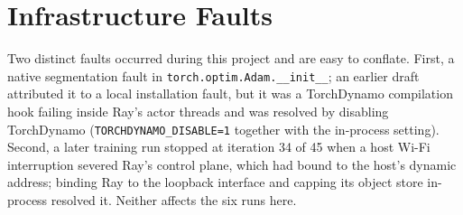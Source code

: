 \documentclass[12pt]{article}
\begin{document}
\section{Infrastructure Faults}
Two distinct faults occurred during this
project and are easy to conflate. First, a native segmentation fault in
\texttt{torch.optim.Adam.\_\_init\_\_}; an earlier draft attributed it to a
local installation fault, but it was a TorchDynamo compilation hook failing
inside Ray's actor threads and was resolved by disabling TorchDynamo
(\texttt{TORCHDYNAMO\_DISABLE=1} together with the in-process setting).
Second, a later training run stopped at iteration 34 of 45 when a host Wi-Fi
interruption severed Ray's control plane, which had bound to the host's
dynamic address; binding Ray to the loopback interface and capping its
object store in-process resolved it. Neither affects the six runs here.




\end{document}
